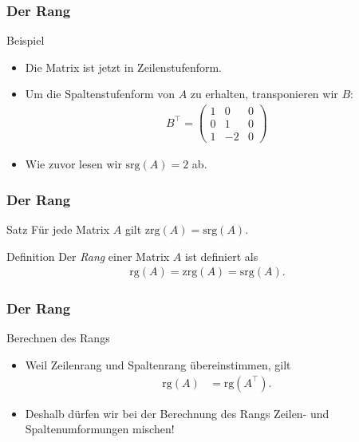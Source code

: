 \documentclass{beamer}
\renewcommand{\emph}[1]{{\textcolor{solarizedRed}{\itshape #1}}}
\newcommand{\trans}{\top}
\newcommand{\ue}{\"u}
\newcommand{\rrk}{\mathrm{zrg}}
\newcommand{\crk}{\mathrm{srg}}
\newcommand{\rk}{\mathrm{rg}}
\newcommand{\mytitle}{Der Rang}
\begin{document}
\begin{frame}\frametitle{\mytitle}
	\begin{block}{Beispiel}
	\begin{itemize}
		\item Die Matrix ist jetzt in Zeilenstufenform.
		\item Um die Spaltenstufenform von $A$ zu erhalten, transponieren wir $B$:
\begin{align*}
				B^\trans=\begin{pmatrix} 1&0&0\\0&1&0\\1&-2&0 \end{pmatrix}
			\end{align*}
		\item Wie zuvor lesen wir $\crk(A)=2$ ab.
	\end{itemize}
	\end{block}
\end{frame}

\begin{frame}\frametitle{\mytitle}
	\begin{block}{Satz}
		F\ue r jede Matrix $A$ gilt $\rrk(A)=\crk(A)$.
	\end{block}
	\begin{block}{Definition}
		Der \emph{Rang} einer Matrix $A$ ist definiert als
		\begin{align*}
			\rk(A)=\rrk(A)=\crk(A).
		\end{align*}
	\end{block}
\end{frame}

\begin{frame}\frametitle{\mytitle}
	\begin{block}{Berechnen des Rangs}
	\begin{itemize}
	\item Weil Zeilenrang und Spaltenrang \ue bereinstimmen, gilt
		\begin{align*}
			\rk(A)&=\rk(A^\trans).
		\end{align*}
	\item Deshalb d\ue rfen wir bei der Berechnung des Rangs Zeilen- und Spaltenumformungen \alert{mischen}!
	\end{itemize}
	\end{block}
\end{frame}
\end{document}
